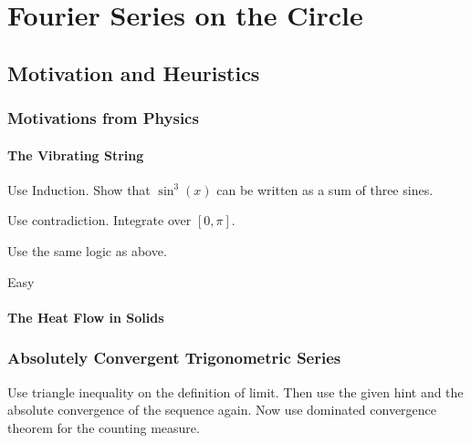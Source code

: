 
\chapter{Fourier Series on the Circle}

\section{Motivation and Heuristics}

\subsection{Motivations from Physics}

\subsubsection{The Vibrating String}

\begin{exercise}
  Use Induction. Show that $\sin^3(x)$ can be written as a sum of three sines.
\end{exercise}

\begin{exercise}
  Use contradiction. Integrate over $[0, \pi]$.
\end{exercise}

\begin{exercise}
  Use the same logic as above.
\end{exercise}

\begin{exercise}
  Easy
\end{exercise}

\subsubsection{The Heat Flow in Solids}

\subsection{Absolutely Convergent Trigonometric Series}

\setcounter{theorem}{6}

\begin{exercise}
  Use triangle inequality on the definition of limit. Then use the
  given hint and the absolute convergence of the sequence again. Now
  use dominated convergence theorem for the counting measure.
\end{exercise}

